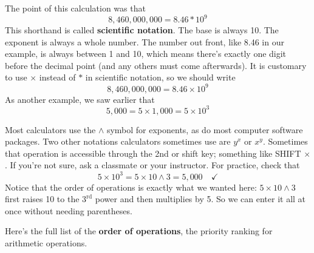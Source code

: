 The point of this calculation was that $$8,460,000,000 = 8.46\ast10^9$$
This shorthand is called \textbf{scientific notation}.  The base is always 10.  The exponent is always a whole number.  The number out front, like 8.46 in our example, is always between 1 and 10, which means there's exactly one digit before the decimal point (and any others must come afterwards).  It is customary to use $\times$ instead of $\ast$ in scientific notation, so we should write
$$8,460,000,000 = 8.46\times10^9$$
As another example, we saw earlier that $$5,000 = 5 \times 1,000 = 5 \times 10^3$$

Most calculators use the $\wedge$ symbol for exponents, as do most computer software packages. Two other notations calculators sometimes use are $y^x$ or $x^y$.  Sometimes that operation is accessible through the 2nd or shift key; something like SHIFT $\times$.  If you're not sure, ask a classmate or your instructor.  For practice, check that
$$5 \times 10^3 = 5 \times 10 \wedge 3 = 5,000 \quad \checkmark$$
 Notice that the order of operations is exactly what we wanted here: $5 \times 10 \wedge 3$ first raises 10 to the $3^{\text{rd}}$ power and then multiplies by 5.  So we can enter it all at once without needing parentheses.
 
Here's the full list of the  \textbf{order of operations}, the priority ranking for arithmetic operations.

\bigskip
\bigskip

